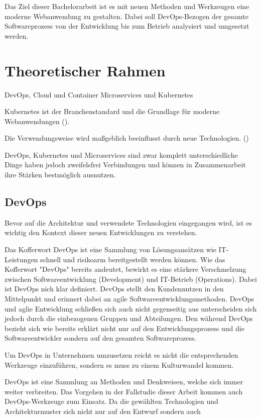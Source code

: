 
Das Ziel dieser Bachelorarbeit ist es mit neuen Methoden und Werkzeugen eine moderne Webanwendung zu gestalten. Dabei soll DevOps-Bezogen der gesamte Softwareprozess von der Entwicklung bis zum Betrieb analysiert und umgesetzt werden.

\section{Theoretischer Rahmen}

DevOps, Cloud und Container Microservices und Kubernetes

Kubernetes ist der Branchenstandard und die Grundlage für moderne Webanwendungen (\cite[Vorwort]{arundelCloud2019}).

Die Verwendungsweise wird maßgeblich beeinflusst durch neue Technologien. (\cite[S. 16]{newmanMicroservices2015})

DevOps, Kubernetes und Microservices sind zwar komplett unterschiedliche Dinge haben jedoch zweifelsfrei Verbindungen und können in Zusammenarbeit ihre Stärken bestmöglich ausnutzen.

\subsection{DevOps}

Bevor auf die Architektur und verwendete Technologien eingegangen wird, ist es wichtig den Kontext dieser neuen Entwicklungen zu verstehen.

Das Kofferwort DevOps ist eine Sammlung von Lösungsansätzen wie IT-Leistungen schnell und risikoarm bereitgestellt werden können. Wie das Kofferwort "DevOps" bereits andeutet, bewirkt es eine stärkere Verschmelzung zwischen Softwareentwicklung (Development) und IT-Betrieb (Operations). Dabei ist DevOps nich klar definiert. DevOps stellt den Kundennutzen in den Mittelpunkt und erinnert dabei an agile Softwareentwicklungsmethoden. DevOps und aglie Entwicklung schließen sich auch nicht gegenseitig aus unterscheiden sich jedoch durch die einbezogenen Gruppen und Abteilungen. Den während DevOps bezieht sich wie bereits erklärt nicht nur auf den Entwicklungsprozess und die Softwareentwickler sondern auf den gesamten Softwareprozess.

Um DevOps in Unternehmen umzusetzen reicht es nicht die entsprechenden Werkzeuge einzuführen, sondern es muss zu einem Kulturwandel kommen.

DevOps ist eine Sammlung an Methoden und Denkweisen, welche sich immer weiter verbreiten. Das Vorgehen in der Fallstudie dieser Arbeit kommen auch DevOps-Werkzeuge zum Einsatz. Da die gewählten Technologien und Architekturmuster sich nicht nur auf den Entwurf sondern auch


